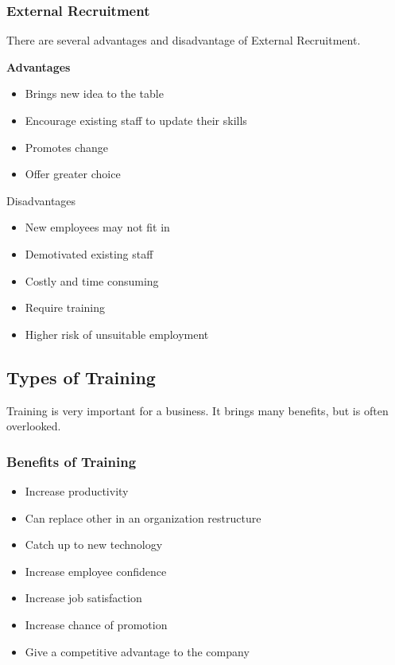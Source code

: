 \documentclass{standalone}
\begin{document}
\subsubsection{External Recruitment}
There are several advantages and disadvantage of External Recruitment.

\textbf{Advantages}\\
\begin{itemize}
	\item Brings new idea to the table
	\item Encourage existing staff to update their skills
	\item Promotes change
	\item Offer greater choice
\end{itemize}

Disadvantages\\
\begin{itemize}
	\item New employees may not fit in
	\item Demotivated existing staff
	\item Costly and time consuming
	\item Require training
	\item Higher risk of unsuitable employment
\end{itemize}

\subsection{Types of Training}
Training is very important for a business.
It brings many benefits, but is often overlooked.

\subsubsection{Benefits of Training}
\begin{itemize}
	\item Increase productivity
	\item Can replace other in an organization restructure
	\item Catch up to new technology
	\item Increase employee confidence
	\item Increase job satisfaction
	\item Increase chance of promotion
	\item Give a competitive advantage to the company
\end{itemize}
\end{document}
